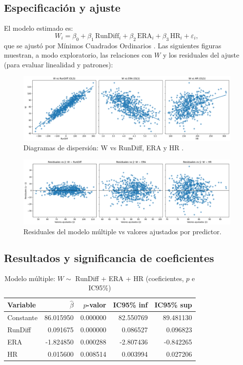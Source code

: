 \documentclass[man,floatsintext]{apa7}
\begin{document}
\subsection{Especificación y ajuste}
El modelo estimado es:
\[
W_i = \beta_0 + \beta_1\,\text{RunDiff}_i + \beta_2\,\text{ERA}_i + \beta_3\,\text{HR}_i + \varepsilon_i,
\]
que se ajustó por Mínimos Cuadrados Ordinarios . Las siguientes figuras muestran, a modo exploratorio, las relaciones con $W$ y los residuales del ajuste (para evaluar linealidad y patrones):

\begin{figure}[H]
    \centering
    \includegraphics[width=\textwidth]{../plots/ols_scatter_grid_RunDiff_ERA_HR.png}
    \caption{Diagramas de dispersión: W vs RunDiff, ERA y HR .}
\end{figure}

\begin{figure}[H]
    \centering
    \includegraphics[width=\textwidth]{../plots/ols_resid_grid_RunDiff_ERA_HR.png}
    \caption{Residuales del modelo múltiple vs valores ajustados por predictor.}
\end{figure}

\subsection{Resultados y significancia de coeficientes}
\begin{table}[H]
    \centering
    \caption{Modelo múltiple: $W \sim$ RunDiff + ERA + HR (coeficientes, $p$ e IC95\%)}
    \label{tab:ols_multi_coefs}
    \begin{tabular}{lrrrr}
        \toprule
        \textbf{Variable} & \textbf{$\hat\beta$} & \textbf{$p$-valor} & \textbf{IC95\% inf} & \textbf{IC95\% sup} \\
        \midrule
        Constante & 86.015950 & 0.000000 & 82.550769 & 89.481130 \\
        RunDiff   & 0.091675  & 0.000000 & 0.086527  & 0.096823  \\
        ERA       & -1.824850 & 0.000288 & -2.807436 & -0.842265 \\
        HR        & 0.015600  & 0.008514 & 0.003994  & 0.027206  \\
        \bottomrule
    \end{tabular}
\end{table}
\end{document}
